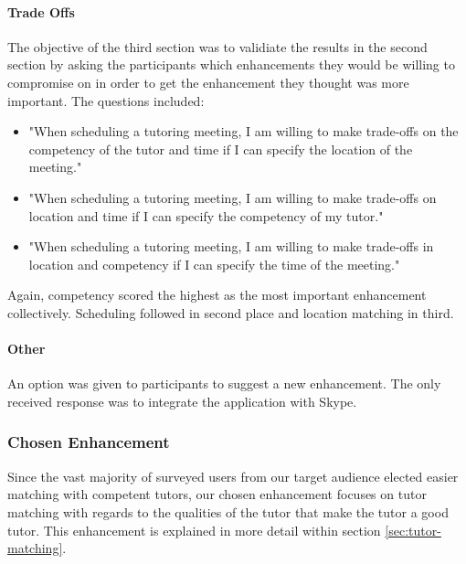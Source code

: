 \paragraph{Trade Offs} The objective of the third section was to
validiate the results in the second section by asking the participants
which enhancements they would be willing to compromise on in order to
get the enhancement they thought was more important. The questions
included:
\begin{itemize}
  \item "When scheduling a tutoring meeting, I am willing to make
trade-offs on the competency of the tutor and time if I can specify
the location of the meeting."
  \item "When scheduling a tutoring meeting, I am willing to make
trade-offs on location and time if I can specify the competency of my
tutor."
  \item "When scheduling a tutoring meeting, I am willing to make
trade-offs in location and competency if I can specify the time of the
meeting."
\end{itemize} Again, competency scored the highest as the most
important enhancement collectively. Scheduling followed in second
place and location matching in third.

\paragraph{Other} An option was given to participants to suggest a new
enhancement. The only received response was to integrate the
application with Skype.

\subsubsection{Chosen Enhancement}
Since the vast majority of surveyed users from our target audience 
elected easier matching with competent tutors, our chosen enhancement
focuses on tutor matching with regards to the qualities of the tutor that 
make the tutor a good tutor. This enhancement is explained in more detail within section \ref{sec:tutor-matching}.



